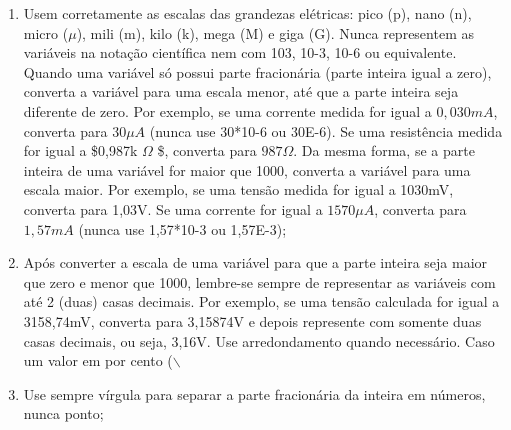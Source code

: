 \documentclass[12pt]{article}
\begin{document}
\begin{enumerate}
\item Usem corretamente as escalas das grandezas elétricas: pico (p), nano (n), micro (\(\mu\)), mili (m), kilo (k), mega (M) e giga (G). Nunca representem as variáveis na notação científica nem com 103, 10-3, 10-6 ou equivalente. Quando uma variável só possui parte fracionária (parte inteira igual a zero), converta a variável para uma escala menor, até que a parte inteira seja diferente de zero. Por exemplo, se uma corrente medida for igual a \(0,030mA\), converta para \(30\mu A\) (nunca use 30*10-6 ou 30E-6). Se uma resistência medida for igual a \$0,987k \(\Omega\) \$, converta para \(987 \Omega\). Da mesma forma, se a parte inteira de uma variável for maior que 1000, converta a variável para uma escala maior. Por exemplo, se uma tensão medida for igual a 1030mV, converta para 1,03V. Se uma corrente for igual a \(1570\mu A\), converta para \(1,57mA\) (nunca use 1,57*10-3 ou 1,57E-3);

\item Após converter a escala de uma variável para que a parte inteira seja maior que zero e menor que 1000, lembre-se sempre de representar as variáveis com até 2 (duas) casas decimais. Por exemplo, se uma tensão calculada for igual a 3158,74mV, converta para 3,15874V e depois represente com somente duas casas decimais, ou seja, 3,16V. Use arredondamento quando necessário. Caso um valor em por cento ($\backslash$%

\item Use sempre vírgula para separar a parte fracionária da inteira em números, nunca ponto;


\end{enumerate}
\end{document}
